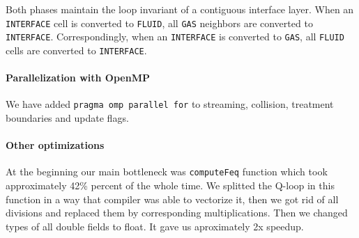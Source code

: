 \documentclass{article}
\begin{document}
Both phases maintain the loop invariant of a contiguous interface layer.
When an \texttt{INTERFACE} cell is converted to \texttt{FLUID}, all
\texttt{GAS} neighbors are converted to \texttt{INTERFACE}.
Correspondingly, when an \texttt{INTERFACE} is converted to
\texttt{GAS}, all \texttt{FLUID} cells are converted to
\texttt{INTERFACE}.

\paragraph{Parallelization with
OpenMP}\label{parallelization-with-openmp}

We have added \texttt{pragma\ omp\ parallel\ for} to streaming,
collision, treatment boundaries and update flags.

\paragraph{Other optimizations}\label{other-optimizations}

At the beginning our main bottleneck was \texttt{computeFeq} function
which took approximately 42\% percent of the whole time. We splitted the
Q-loop in this function in a way that compiler was able to vectorize it,
then we got rid of all divisions and replaced them by corresponding
multiplications. Then we changed types of all double fields to float. It
gave us aproximately 2x speedup.
\end{document}
